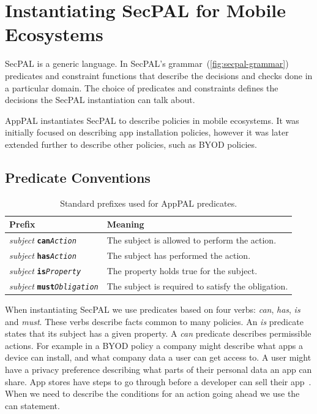 \documentclass[thesis.tex]{subfiles}
\begin{document}
\section{Instantiating SecPAL for Mobile Ecosystems}
\label{sec:instantiating}

SecPAL is a generic language.  In SecPAL's
grammar~(\autoref{fig:secpal-grammar}) predicates and constraint
functions that describe the decisions and checks done in a particular
domain.  The choice of predicates and constraints defines the
decisions the SecPAL instantiation can talk about.

AppPAL instantiates SecPAL to describe policies in mobile
ecosystems. It was initially focused on
describing app installation policies, however it was later extended
further to describe other policies, such as \ac{BYOD} policies.

\subsection{Predicate Conventions}
\label{ssec:types}

\newcommand{\descPred}[2]{\emph{subject} \texttt{\textbf{#1}\emph{#2}}}
\begin{table}\footnotesize\sffamily\centering
  \begin{tabular}{l l}
    \toprule
    Prefix                      & Meaning                                            \\
    \midrule
    \descPred{can}{Action}      & The subject is allowed to perform the action.      \\
    \descPred{has}{Action}      & The subject has performed the action.              \\
    \descPred{is}{Property}     & The property holds true for the subject.           \\
    \descPred{must}{Obligation} & The subject is required to satisfy the obligation. \\
    \bottomrule
  \end{tabular}
  \caption{Standard prefixes used for AppPAL predicates.}
  \label{tab:predicate-prefixes}
\end{table}

When instantiating SecPAL we use predicates based on four verbs: \emph{can}, \emph{has}, \emph{is} and \emph{must}.
These verbs describe facts common to many policies.
An \emph{is} predicate states that its subject has a given property.
A \emph{can} predicate describes permissible actions.
For example in a \ac{BYOD} policy a company might describe what apps a device can install, and what company data a user can get access to.
A user might have a privacy preference describing what parts of their personal data an app can share.
App stores have steps to go through before a developer can sell their app~\cite{oberheide_dissecting_2012,google_google_2017}.
When we need to describe the conditions for an action going ahead we use the can statement.
\end{document}
